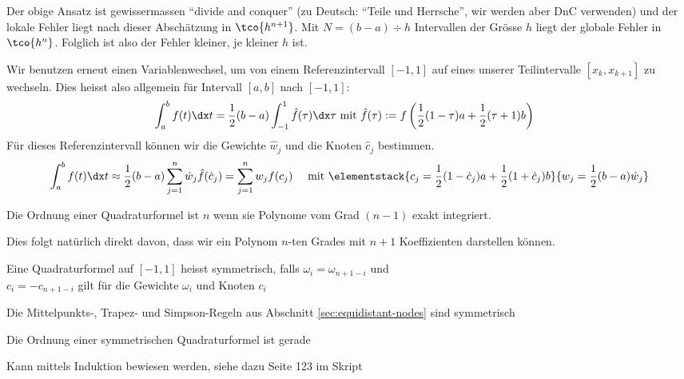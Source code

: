 \rmvspace
Der obige Ansatz ist gewissermassen ``divide and conquer'' (zu Deutsch: ``Teile und Herrsche'', wir werden aber DnC verwenden)
und der lokale Fehler liegt nach dieser Abschätzung in $\tco{h^{n + 1}}$. Mit $N = (b - a) \div h$ Intervallen der Grösse $h$ liegt der globale Fehler in $\tco{h^{n}}$.
Folglich ist also der Fehler kleiner, je kleiner $h$ ist.

Wir benutzen erneut einen Variablenwechsel, um von einem Referenzintervall $[-1, 1]$ auf eines unserer Teilintervalle $[x_k, x_{k + 1}]$ zu wechseln.
Dies heisst also allgemein für Intervall $[a, b]$ nach $[-1, 1]$:
\begin{align*}
    \int_{a}^{b} f(t) \dx t = \frac{1}{2} (b - a) \int_{-1}^{1} \hat{f}(\tau) \dx \tau & \text{ mit } \hat{f}(\tau) := f\left( \frac{1}{2}(1 - \tau) a + \frac{1}{2}(\tau + 1) b \right)
\end{align*}
Für dieses Referenzintervall können wir die Gewichte $\hat{w}_j$ und die Knoten $\hat{c}_j$ bestimmen.
\rmvspace
\begin{align*}
    \int_{a}^{b} f(t) \dx t \approx \frac{1}{2}(b - a) \sum_{j = 1}^{n} \hat{w}_j \hat{f}(\hat{c}_j) = \sum_{j = 1}^{n} w_j f(c_j)
     &  & \text{ mit } \elementstack{c_j = \frac{1}{2} (1 - \hat{c}_j) a + \frac{1}{2}(1 + \hat{c}_j) b}{w_j = \frac{1}{2}(b - a)\hat{w}_j}
\end{align*}

\rmvspace\rmvspace
\inlinedef Die Ordnung einer Quadraturformel ist $n$ wenn sie Polynome vom Grad $(n - 1)$ exakt integriert.

Dies folgt natürlich direkt davon, dass wir ein Polynom $n$-ten Grades mit $n + 1$ Koeffizienten darstellen können.

 Eine Quadraturformel auf $[-1, 1]$ heisst symmetrisch, falls $\omega_i = \omega_{n + 1 - i}$ und \\
$c_i = -c_{n + 1 -i}$ gilt für die Gewichte $\omega_i$ und Knoten $c_i$

\inlineremark Die Mittelpunkts-, Trapez- und Simpson-Regeln aus Abschnitt \ref{sec:equidistant-nodes} sind symmetrisch

\inlinetheorem Die Ordnung einer symmetrischen Quadraturformel ist gerade

\inlineproof Kann mittels Induktion bewiesen werden, siehe dazu Seite 123 im Skript
